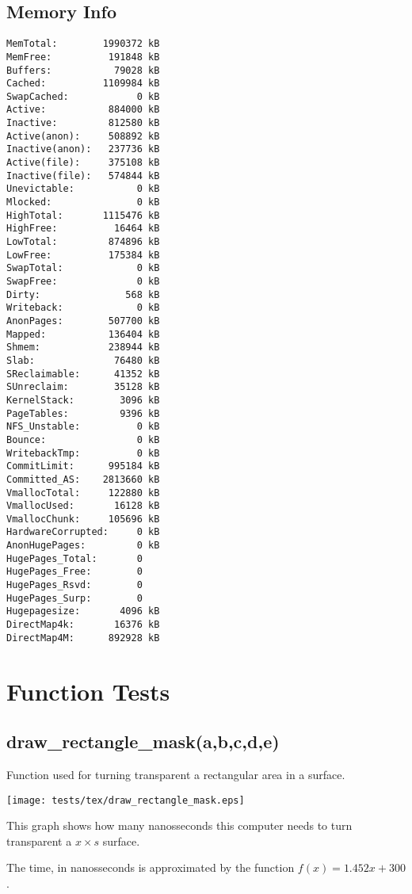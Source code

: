 \documentclass{article}
\begin{document}
\subsection{Memory Info}
\begin{verbatim}
MemTotal:        1990372 kB
MemFree:          191848 kB
Buffers:           79028 kB
Cached:          1109984 kB
SwapCached:            0 kB
Active:           884000 kB
Inactive:         812580 kB
Active(anon):     508892 kB
Inactive(anon):   237736 kB
Active(file):     375108 kB
Inactive(file):   574844 kB
Unevictable:           0 kB
Mlocked:               0 kB
HighTotal:       1115476 kB
HighFree:          16464 kB
LowTotal:         874896 kB
LowFree:          175384 kB
SwapTotal:             0 kB
SwapFree:              0 kB
Dirty:               568 kB
Writeback:             0 kB
AnonPages:        507700 kB
Mapped:           136404 kB
Shmem:            238944 kB
Slab:              76480 kB
SReclaimable:      41352 kB
SUnreclaim:        35128 kB
KernelStack:        3096 kB
PageTables:         9396 kB
NFS_Unstable:          0 kB
Bounce:                0 kB
WritebackTmp:          0 kB
CommitLimit:      995184 kB
Committed_AS:    2813660 kB
VmallocTotal:     122880 kB
VmallocUsed:       16128 kB
VmallocChunk:     105696 kB
HardwareCorrupted:     0 kB
AnonHugePages:         0 kB
HugePages_Total:       0
HugePages_Free:        0
HugePages_Rsvd:        0
HugePages_Surp:        0
Hugepagesize:       4096 kB
DirectMap4k:       16376 kB
DirectMap4M:      892928 kB
\end{verbatim}
\section{Function Tests}
\subsection{draw\_rectangle\_mask(a,b,c,d,e)}
Function used for turning transparent a 
rectangular area in a surface. 

\texttt{[image: tests/tex/draw\_rectangle\_mask.eps]}

This graph shows how many nanosseconds this computer needs to turn transparent a $x \times s$ surface.

The time, in nanosseconds is 
approximated by the function $f(x)=1.452x+300$.
\end{document}
